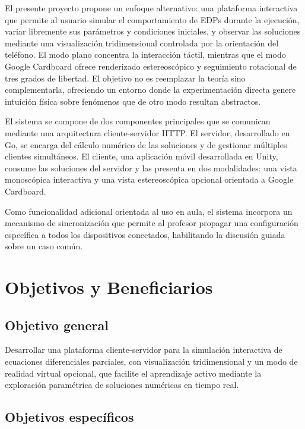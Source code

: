 \documentclass[12pt, a4paper]{article}
\begin{document}
El presente proyecto propone un enfoque alternativo: una plataforma interactiva que
permite al usuario simular el comportamiento de EDPs durante la ejecución, variar
libremente sus parámetros y condiciones iniciales, y observar las soluciones mediante
una visualización tridimensional controlada por la orientación del teléfono. El modo
plano concentra la interacción táctil, mientras que el modo Google Cardboard ofrece
renderizado estereoscópico y seguimiento rotacional de tres grados de libertad. El objetivo no es
reemplazar la teoría sino complementarla, ofreciendo un entorno donde la experimentación
directa genere intuición física sobre fenómenos que de otro modo resultan abstractos.

El sistema se compone de dos componentes principales que se comunican mediante una
arquitectura cliente-servidor HTTP. El servidor, desarrollado en Go, se encarga del
cálculo numérico de las soluciones y de gestionar múltiples clientes simultáneos. El
cliente, una aplicación móvil desarrollada en Unity, consume las soluciones del servidor
y las presenta en dos modalidades: una vista monoscópica interactiva y una vista
estereoscópica opcional orientada a Google Cardboard.

Como funcionalidad adicional orientada al uso en aula, el sistema incorpora un
mecanismo de sincronización que permite al profesor propagar una configuración
específica a todos los dispositivos conectados, habilitando la discusión guiada sobre
un caso común.

\newpage

\section{Objetivos y Beneficiarios}

\subsection{Objetivo general}

Desarrollar una plataforma cliente-servidor para la simulación interactiva de
ecuaciones diferenciales parciales, con visualización tridimensional y un modo de
realidad virtual opcional, que
facilite el aprendizaje activo mediante la exploración paramétrica de soluciones
numéricas en tiempo real.

\subsection{Objetivos específicos}
\end{document}
